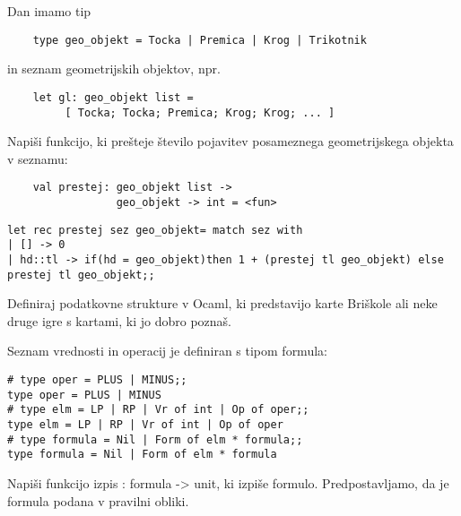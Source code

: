 \begin{ex}
Dan imamo tip 

\begin{lstlisting}
	type geo_objekt = Tocka | Premica | Krog | Trikotnik 
\end{lstlisting}
in seznam geometrijskih objektov, npr.

\begin{lstlisting}
	let gl: geo_objekt list = 
         [ Tocka; Tocka; Premica; Krog; Krog; ... ] 
\end{lstlisting}

Napi\v si funkcijo, ki pre\v steje \v stevilo pojavitev posameznega geometrijskega objekta v seznamu:

\begin{lstlisting}
	val prestej: geo_objekt list -> 
                 geo_objekt -> int = <fun>
\end{lstlisting}

\begin{sol}
\begin{lstlisting}
let rec prestej sez geo_objekt= match sez with
| [] -> 0
| hd::tl -> if(hd = geo_objekt)then 1 + (prestej tl geo_objekt) else prestej tl geo_objekt;;
\end{lstlisting}
\end{sol}

\end{ex}
\begin{ex}
Definiraj podatkovne strukture v Ocaml, ki predstavijo karte Bri\v skole ali neke druge igre s kartami, ki jo dobro pozna\v s.



\end{ex}
\begin{ex}
Seznam vrednosti in operacij je definiran s tipom formula: 
\begin{lstlisting}
# type oper = PLUS | MINUS;; 
type oper = PLUS | MINUS 
# type elm = LP | RP | Vr of int | Op of oper;; 
type elm = LP | RP | Vr of int | Op of oper 
# type formula = Nil | Form of elm * formula;; 
type formula = Nil | Form of elm * formula 
\end{lstlisting}


Napi\v si funkcijo izpis : formula -> unit, ki izpi\v se formulo. Predpostavljamo, da je formula podana v pravilni obliki.



\end{ex}
